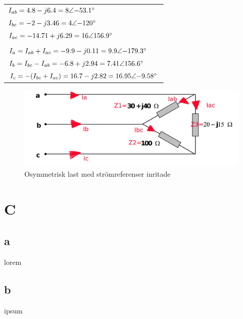 \documentclass{article}
\begin{document}
  \begin{tabular}{| l}
    $I_{ab}=4.8-j6.4=8\angle{-53.1\degree}$\\
    $I_{bc}=-2-j3.46=4\angle{-120\degree}$\\
    $I_{ac}=-14.71+j6.29=16\angle{156.9\degree}$\\
    \\
    $I_a=I_{ab}+I_{ac}=-9.9-j0.11=9.9\angle{-179.3\degree}$\\
    $I_b=I_{bc}-I_{ab}=-6.8+j2.94=7.41\angle{156.6\degree}$\\
    $I_c=-(I_{bc}+I_{ac})=16.7-j2.82=16.95\angle{-9.58\degree}$\\
  \end{tabular}


  \begin{figure}[H]
  \begin{center}
  \includegraphics[width=1\textwidth]{img/osymmetrisk-last1.jpg} %
  \caption{Osymmetrisk last med strömreferenser inritade}
  \label{fig:osymm}
  \end{center}
  \end{figure}


\section{C}
\subsection{a}
lorem
\subsection{b}
ipsum
\end{document}
